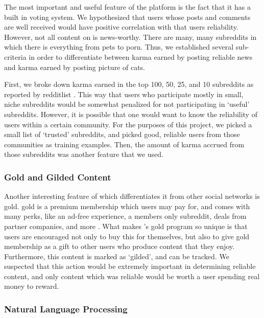 The most important and useful feature of the \reddit{} platform is the fact that
it has a built in voting system. We hypothesized that users whose posts and
comments are well received would have positive correlation with that users
reliability. However, not all content on \reddit{} is news-worthy. There are
many, many subreddits in which there is everything from pets to porn. Thus, we
established several sub-criteria in order to differentiate between karma earned
by posting reliable news and karma earned by posting picture of cats.

First, we broke down karma earned in the top 100, 50, 25, and 10 subreddits as
reported by redditlist \cite{redditlist}. This way that users who participate
mostly in small, niche subreddits would be somewhat penalized for not
participating in `useful' subreddits. However, it is possible that one would
want to know the reliability of users within a certain community. For the
purposes of this project, we picked a small list of `trusted' subreddits, and
picked good, reliable users from those communities as training examples. Then,
the amount of karma accrued from those subreddits was another feature that we
used.


\subsubsection{\reddit{} Gold and Gilded Content} %
\label{ssub:reddit_gold_and_gilded_content}

Another interesting feature of \reddit{} which differentiates it from other
social networks is \reddit{} gold. \reddit{} gold is a premium membership which
users may pay for, and comes with many perks, like an ad-free experience, a
members only subreddit, deals from partner companies, and more
\cite{redditgold}. What makes \reddit{}'s gold program so unique is that users
are encouraged not only to buy this for themselves, but also to give \reddit{}
gold membership as a gift to other users who produce content that they enjoy.
Furthermore, this content is marked as `gilded', and can be tracked. We
suspected that this action would be extremely important in determining reliable
content, and only content which was reliable would be worth a user spending real
money to reward.



\subsubsection{Natural Language Processing} %
\label{ssub:natural_language_processing}

